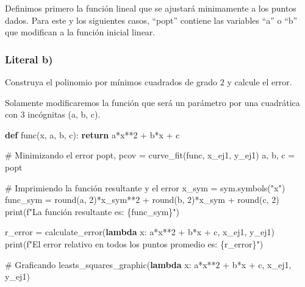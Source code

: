 \documentclass[
  letterpaper,
  DIV=11,
  numbers=noendperiod]{scrartcl}
\newenvironment{Shaded}{\begin{snugshade}}{\end{snugshade}}
\newcommand{\BuiltInTok}[1]{\textcolor[rgb]{0.00,0.23,0.31}{#1}}
\newcommand{\CommentTok}[1]{\textcolor[rgb]{0.37,0.37,0.37}{#1}}
\newcommand{\ControlFlowTok}[1]{\textcolor[rgb]{0.00,0.23,0.31}{\textbf{#1}}}
\newcommand{\DecValTok}[1]{\textcolor[rgb]{0.68,0.00,0.00}{#1}}
\newcommand{\KeywordTok}[1]{\textcolor[rgb]{0.00,0.23,0.31}{\textbf{#1}}}
\newcommand{\NormalTok}[1]{\textcolor[rgb]{0.00,0.23,0.31}{#1}}
\newcommand{\OperatorTok}[1]{\textcolor[rgb]{0.37,0.37,0.37}{#1}}
\newcommand{\SpecialCharTok}[1]{\textcolor[rgb]{0.37,0.37,0.37}{#1}}
\newcommand{\SpecialStringTok}[1]{\textcolor[rgb]{0.13,0.47,0.30}{#1}}
\newcommand{\StringTok}[1]{\textcolor[rgb]{0.13,0.47,0.30}{#1}}
\begin{document}
Definimos primero la función lineal que se ajustará minimamente a los
puntos dados. Para este y los siguientes casos, ``popt'' contiene las
variables ``a'' o ``b'' que modifican a la función inicial linear.

\subsubsection{Literal b)}\label{literal-b}

Construya el polinomio por mínimos cuadrados de grado 2 y calcule el
error.

Solamente modificaremos la función que será un parámetro por una
cuadrática con 3 incógnitas (a, b, c).

\begin{Shaded}
\begin{Highlighting}[]

\KeywordTok{def}\NormalTok{ func(x, a, b, c):}
    \ControlFlowTok{return}\NormalTok{ a}\OperatorTok{*}\NormalTok{x}\OperatorTok{**}\DecValTok{2} \OperatorTok{+}\NormalTok{ b}\OperatorTok{*}\NormalTok{x }\OperatorTok{+}\NormalTok{ c}

\CommentTok{\# Minimizando el error}
\NormalTok{popt, pcov }\OperatorTok{=}\NormalTok{ curve\_fit(func, x\_ej1, y\_ej1)}
\NormalTok{a, b, c }\OperatorTok{=}\NormalTok{ popt}

\CommentTok{\# Imprimiendo la función resultante y el error}
\NormalTok{x\_sym }\OperatorTok{=}\NormalTok{ sym.symbols(}\StringTok{"x"}\NormalTok{)}
\NormalTok{func\_sym }\OperatorTok{=} \BuiltInTok{round}\NormalTok{(a, }\DecValTok{2}\NormalTok{)}\OperatorTok{*}\NormalTok{x\_sym}\OperatorTok{**}\DecValTok{2} \OperatorTok{+} \BuiltInTok{round}\NormalTok{(b, }\DecValTok{2}\NormalTok{)}\OperatorTok{*}\NormalTok{x\_sym }\OperatorTok{+} \BuiltInTok{round}\NormalTok{(c, }\DecValTok{2}\NormalTok{)}
\BuiltInTok{print}\NormalTok{(}\SpecialStringTok{f"La función resultante es: }\SpecialCharTok{\{}\NormalTok{func\_sym}\SpecialCharTok{\}}\SpecialStringTok{"}\NormalTok{)}

\NormalTok{r\_error }\OperatorTok{=}\NormalTok{ calculate\_error(}\KeywordTok{lambda}\NormalTok{ x: a}\OperatorTok{*}\NormalTok{x}\OperatorTok{**}\DecValTok{2} \OperatorTok{+}\NormalTok{ b}\OperatorTok{*}\NormalTok{x }\OperatorTok{+}\NormalTok{ c, x\_ej1, y\_ej1)}
\BuiltInTok{print}\NormalTok{(}\SpecialStringTok{f"El error relativo en todos los puntos promedio es: }\SpecialCharTok{\{}\NormalTok{r\_error}\SpecialCharTok{\}}\SpecialStringTok{"}\NormalTok{)}

\CommentTok{\# Graficando}
\NormalTok{leasts\_squares\_graphic(}\KeywordTok{lambda}\NormalTok{ x: a}\OperatorTok{*}\NormalTok{x}\OperatorTok{**}\DecValTok{2} \OperatorTok{+}\NormalTok{ b}\OperatorTok{*}\NormalTok{x }\OperatorTok{+}\NormalTok{ c, x\_ej1, y\_ej1)}
\end{Highlighting}
\end{Shaded}
\end{document}
